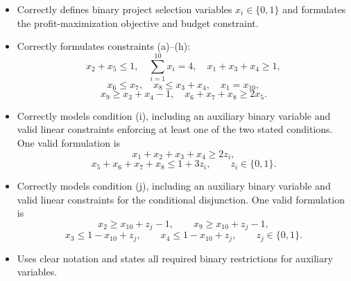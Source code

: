 
\begin{itemize}
    \item Correctly defines binary project selection variables $x_i\in\{0,1\}$ and
    formulates the profit-maximization objective and budget constraint. 

    \item Correctly formulates constraints (a)--(h):
    \[
    x_2+x_5\leq 1,\quad
    \sum_{i=1}^{10}x_i=4,\quad
    x_1+x_3+x_4\geq 1,
    \]
    \[
    x_6\leq x_7,\quad
    x_8\leq x_3+x_4,\quad
    x_1=x_{10},
    \]
    \[
    x_9\geq x_3+x_4-1,\quad
    x_6+x_7+x_8\geq 2x_5.
    \]

    \item Correctly models condition (i), including an auxiliary binary variable and
    valid linear constraints enforcing at least one of the two stated conditions.
    One valid formulation is
    \[
    x_1+x_2+x_3+x_4\geq 2z_i,
    \]
    \[
    x_5+x_6+x_7+x_8\leq 1+3z_i,\qquad z_i\in\{0,1\}.
    \]

    \item Correctly models condition (j), including an auxiliary binary variable and
    valid linear constraints for the conditional disjunction. One valid formulation is
    \[
    x_2\geq x_{10}+z_j-1,\qquad
    x_9\geq x_{10}+z_j-1,
    \]
    \[
    x_3\leq 1-x_{10}+z_j,\qquad
    x_4\leq 1-x_{10}+z_j,\qquad
    z_j\in\{0,1\}.
    \]

    \item Uses clear notation and states all required binary restrictions for auxiliary
    variables. 
\end{itemize}





